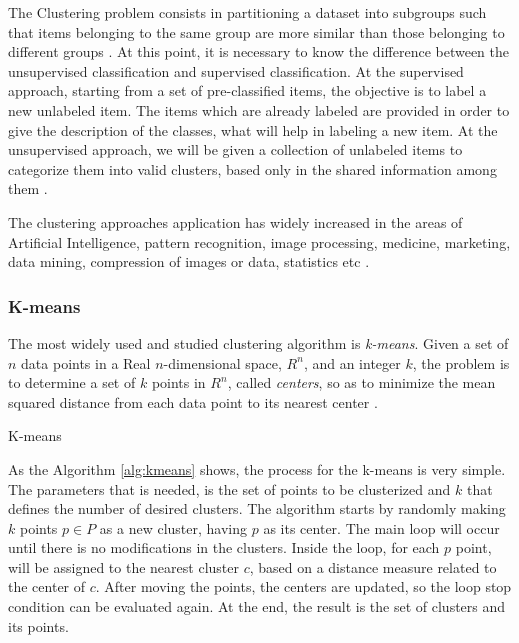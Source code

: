 \documentclass[journal]{IEEEtran}
\begin{document}
The Clustering problem consists in partitioning a dataset into subgroups such that items belonging to the same group are more similar than those belonging to different groups \cite{boric2007genetic}. At this point, it is necessary to know the difference between the unsupervised classification and supervised classification. At the supervised approach, starting from a set of pre-classified items, the objective is to label a new unlabeled item. The items which are already labeled are provided in order to give the description of the classes, what will help in labeling a new item. At the unsupervised approach, we will be given a collection of unlabeled items to categorize them into valid clusters, based only in the shared information among them \cite{ahalya2015data}.

The clustering approaches application has widely increased in the areas of Artificial Intelligence, pattern recognition, image processing, medicine, marketing, data mining, compression of images or data, statistics etc \cite{ahalya2015data}.

\subsubsection{K-means}

The most widely used and studied clustering algorithm is \textit{k-means}. Given a set of $n$ data points in a Real $n$-dimensional space, $R^n$, and an integer $k$, the problem is to determine a set of $k$ points in $R^n$, called \textit{centers}, so as to minimize the mean squared distance from each data point to its nearest center \cite{kanungo2002efficient}.


\begin{algorithm}
	\caption{K-means}
	\label{alg:kmeans}
\end{algorithm}

As the Algorithm \ref{alg:kmeans} shows, the process for the k-means is very simple. The parameters that is needed, is the set of points to be clusterized and $k$ that defines the number of desired clusters. The algorithm starts by randomly making $k$ points $p \in P$ as a new cluster, having $p$ as its center. The main loop will occur until there is no modifications in the clusters. Inside the loop, for each $p$ point, will be assigned to the nearest cluster $c$, based on a distance measure related to the center of $c$. After moving the points, the centers are updated, so the loop stop condition can be evaluated again. At the end, the result is the set of clusters and its points.
\end{document}
